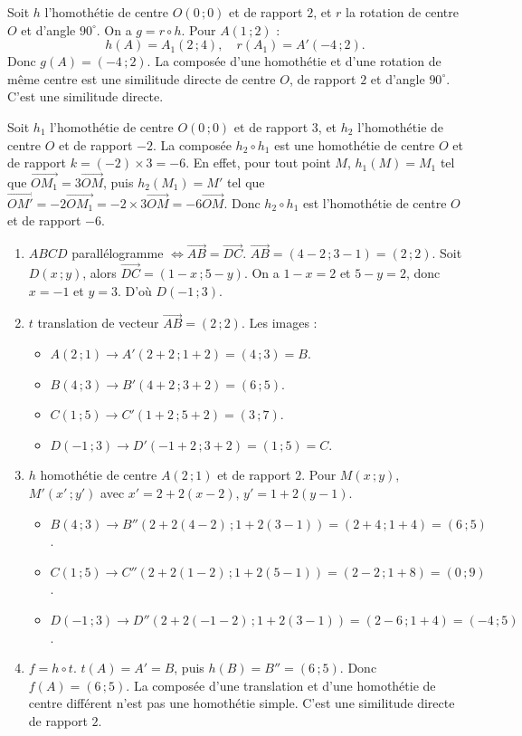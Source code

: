 Soit \(h\) l'homothétie de centre \(O(0\,; 0)\) et de rapport \(2\), et \(r\) la rotation de centre \(O\) et d'angle \(90^\circ\). On a \(g = r \circ h\).
Pour \(A(1\,; 2)\) :
\[
h(A) = A_1(2\,; 4), \quad r(A_1) = A'(-4\,; 2).
\]
Donc \(g(A) = (-4\,; 2)\).
La composée d'une homothétie et d'une rotation de même centre est une similitude directe de centre \(O\), de rapport \(2\) et d'angle \(90^\circ\). C'est une similitude directe.

Soit \(h_1\) l'homothétie de centre \(O(0\,; 0)\) et de rapport \(3\), et \(h_2\) l'homothétie de centre \(O\) et de rapport \(-2\). La composée \(h_2 \circ h_1\) est une homothétie de centre \(O\) et de rapport \(k = (-2) \times 3 = -6\). En effet, pour tout point \(M\), \(h_1(M) = M_1\) tel que \(\overrightarrow{OM_1} = 3 \overrightarrow{OM}\), puis \(h_2(M_1) = M'\) tel que \(\overrightarrow{OM'} = -2 \overrightarrow{OM_1} = -2 \times 3 \overrightarrow{OM} = -6 \overrightarrow{OM}\). Donc \(h_2 \circ h_1\) est l'homothétie de centre \(O\) et de rapport \(-6\).

\begin{enumerate}[label=\arabic*)]
    \item \(ABCD\) parallélogramme \(\iff \overrightarrow{AB} = \overrightarrow{DC}\). \(\overrightarrow{AB} = (4-2\,; 3-1) = (2\,; 2)\). Soit \(D(x\,; y)\), alors \(\overrightarrow{DC} = (1-x\,; 5-y)\). On a \(1-x = 2\) et \(5-y = 2\), donc \(x = -1\) et \(y = 3\). D'où \(D(-1\,; 3)\).
    \item \(t\) translation de vecteur \(\overrightarrow{AB} = (2\,; 2)\). Les images :
    \begin{itemize}
        \item \(A(2\,; 1) \to A'(2+2\,; 1+2) = (4\,; 3) = B\).
        \item \(B(4\,; 3) \to B'(4+2\,; 3+2) = (6\,; 5)\).
        \item \(C(1\,; 5) \to C'(1+2\,; 5+2) = (3\,; 7)\).
        \item \(D(-1\,; 3) \to D'(-1+2\,; 3+2) = (1\,; 5) = C\).
    \end{itemize}
    \item \(h\) homothétie de centre \(A(2\,; 1)\) et de rapport \(2\). Pour \(M(x\,; y)\), \(M'(x'\,; y')\) avec \(x' = 2 + 2(x-2)\), \(y' = 1 + 2(y-1)\).
    \begin{itemize}
        \item \(B(4\,; 3) \to B''(2+2(4-2)\,; 1+2(3-1)) = (2+4\,; 1+4) = (6\,; 5)\).
        \item \(C(1\,; 5) \to C''(2+2(1-2)\,; 1+2(5-1)) = (2-2\,; 1+8) = (0\,; 9)\).
        \item \(D(-1\,; 3) \to D''(2+2(-1-2)\,; 1+2(3-1)) = (2-6\,; 1+4) = (-4\,; 5)\).
    \end{itemize}
    \item \(f = h \circ t\). \(t(A) = A' = B\), puis \(h(B) = B'' = (6\,; 5)\). Donc \(f(A) = (6\,; 5)\). La composée d'une translation et d'une homothétie de centre différent n'est pas une homothétie simple. C'est une similitude directe de rapport \(2\).
\end{enumerate}

